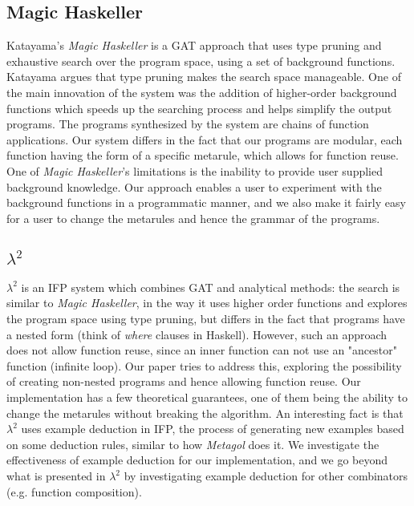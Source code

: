 \subsection{Magic Haskeller}
\indent \indent Katayama's \textit{Magic Haskeller} \cite{mhask} is a GAT approach that uses type pruning and exhaustive search over the program space, using a set of background functions. Katayama argues that type pruning makes the search space manageable. One of the main innovation of the system was the addition of higher-order background functions which speeds up the searching process and helps simplify the output programs. The programs synthesized by the system are chains of function applications. Our system differs in the fact that our programs are modular, each function having the form of a specific metarule, which allows for function reuse. One of \textit{Magic Haskeller}'s limitations is the inability to provide user supplied background knowledge. Our approach enables a user to experiment with the background functions in a programmatic manner, and we also make it fairly easy for a user to change the metarules and hence the grammar of the programs. 
\subsection{$\lambda^{2}$}
\indent \indent \textit{$\lambda^{2}$} \cite{lambdasq} is an IFP system which combines GAT and analytical methods: the search is similar to \textit{Magic Haskeller}, in the way it uses higher order functions and explores the program space using type pruning, but differs in the fact that programs have a nested form (think of \textit{where} clauses in Haskell). However, such an approach does not allow function reuse, since an inner function can not use an "ancestor" function (infinite loop). Our paper tries to address this, exploring the possibility of creating non-nested programs and hence allowing function reuse. Our implementation has a few theoretical guarantees, one of them being the ability to change the metarules without breaking the algorithm. An interesting fact is that $\lambda^{2}$ uses example deduction in IFP, the process of generating new examples based on some deduction rules, similar to how \textit{Metagol} does it. We investigate the effectiveness of example deduction for our implementation, and we go beyond what is presented in \textit{$\lambda^{2}$} by investigating example deduction for other combinators (e.g. function composition).


